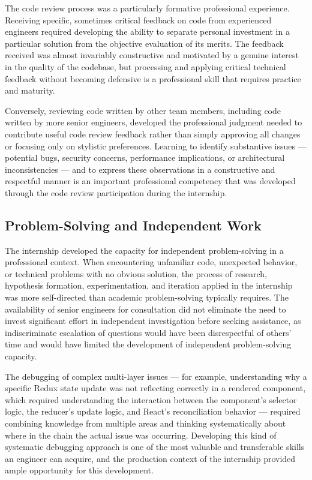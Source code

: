 The code review process was a particularly formative professional experience. Receiving specific, sometimes critical feedback on code from experienced engineers required developing the ability to separate personal investment in a particular solution from the objective evaluation of its merits. The feedback received was almost invariably constructive and motivated by a genuine interest in the quality of the codebase, but processing and applying critical technical feedback without becoming defensive is a professional skill that requires practice and maturity.

Conversely, reviewing code written by other team members, including code written by more senior engineers, developed the professional judgment needed to contribute useful code review feedback rather than simply approving all changes or focusing only on stylistic preferences. Learning to identify substantive issues — potential bugs, security concerns, performance implications, or architectural inconsistencies — and to express these observations in a constructive and respectful manner is an important professional competency that was developed through the code review participation during the internship.

\subsection{Problem-Solving and Independent Work}

The internship developed the capacity for independent problem-solving in a professional context. When encountering unfamiliar code, unexpected behavior, or technical problems with no obvious solution, the process of research, hypothesis formation, experimentation, and iteration applied in the internship was more self-directed than academic problem-solving typically requires. The availability of senior engineers for consultation did not eliminate the need to invest significant effort in independent investigation before seeking assistance, as indiscriminate escalation of questions would have been disrespectful of others' time and would have limited the development of independent problem-solving capacity.

The debugging of complex multi-layer issues — for example, understanding why a specific Redux state update was not reflecting correctly in a rendered component, which required understanding the interaction between the component's selector logic, the reducer's update logic, and React's reconciliation behavior — required combining knowledge from multiple areas and thinking systematically about where in the chain the actual issue was occurring. Developing this kind of systematic debugging approach is one of the most valuable and transferable skills an engineer can acquire, and the production context of the internship provided ample opportunity for this development.

